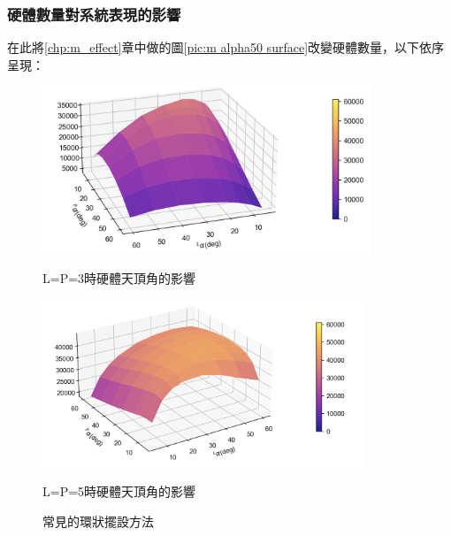 



\subsubsection{硬體數量對系統表現的影響}
\label{chp:amount_effect}

在此將\ref{chp:m_effect}章中做的圖\ref{pic:m alpha50 surface}改變硬體數量，以下依序呈現：


\begin{figure}[htpb]
    \centering
    \begin{minipage}{.5\textwidth}
        \centering
        \includegraphics[height=5cm]{ch4pic/num3 alpha surface.png}
        \captionsetup{labelformat=empty}
        \caption*{L=P=3時硬體天頂角的影響}
    \end{minipage}%
    \begin{minipage}{0.5\textwidth}
        \centering
        \includegraphics[height=5cm]{ch4pic/num5 alpha surface.png}
        \captionsetup{labelformat=empty}
        \caption*{L=P=5時硬體天頂角的影響}
    \end{minipage}
    \caption{常見的環狀擺設方法}
    \label{fig:config_a}
\end{figure}






